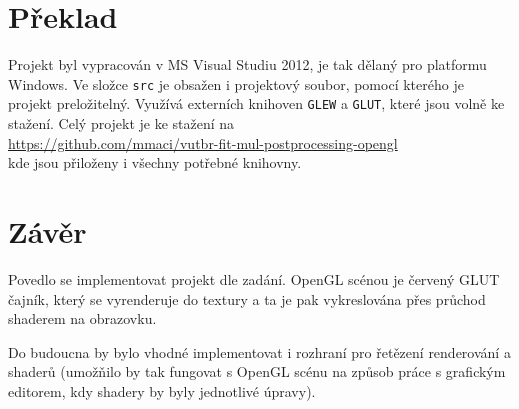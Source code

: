 \documentclass[12pt,a4paper,titlepage,final]{report}
\begin{document}
\section{Překlad}

Projekt byl vypracován v MS Visual Studiu 2012, je tak dělaný pro platformu Windows. Ve složce \verb|src| je obsažen i projektový soubor, pomocí kterého je projekt preložitelný. Využívá externích knihoven \verb|GLEW| a \verb|GLUT|, které jsou volně ke stažení. Celý projekt je ke stažení na \\
 \url{https://github.com/mmaci/vutbr-fit-mul-postprocessing-opengl} \\
kde jsou přiloženy i všechny potřebné knihovny.




\section{Závěr}

Povedlo se implementovat projekt dle zadání. OpenGL scénou je červený GLUT čajník, který se vyrenderuje do textury a ta je pak vykreslována přes průchod shaderem na obrazovku.

Do budoucna by bylo vhodné implementovat i rozhraní pro řetězení renderování a shaderů (umožňilo by tak fungovat s OpenGL scénu na způsob práce s grafickým editorem, kdy shadery by byly jednotlivé úpravy).



\nocite{cite1}
\nocite{cite2}
\nocite{cite3}
\nocite{cite4}
\nocite{cite5}

\hypertarget{bib}{}

\end{document}
